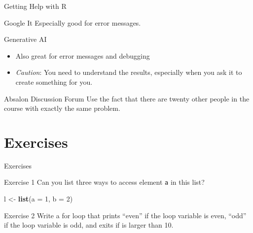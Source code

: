 \documentclass[
  ignorenonframetext,
  aspectratio=1610,
  onlytextwidth]{beamer}
\newenvironment{Shaded}{\begin{snugshade}}{\end{snugshade}}
\newcommand{\AttributeTok}[1]{\textcolor[rgb]{0.13,0.29,0.53}{#1}}
\newcommand{\DecValTok}[1]{\textcolor[rgb]{0.00,0.00,0.81}{#1}}
\newcommand{\FunctionTok}[1]{\textcolor[rgb]{0.13,0.29,0.53}{\textbf{#1}}}
\newcommand{\NormalTok}[1]{#1}
\newcommand{\OtherTok}[1]{\textcolor[rgb]{0.56,0.35,0.01}{#1}}
\providecommand{\tightlist}{}
\begin{document}
\begin{frame}{Getting Help with R}
\label{getting-help-with-r}
\begin{block}{Google It}
\label{google-it}
Especially good for error messages.

\pause
\end{block}

\begin{block}{Generative AI}
\label{generative-ai-1}
\begin{itemize}
\tightlist
\item
  Also great for error messages and debugging
\item
  \emph{Caution}: You need to understand the results, especially when
  you ask it to create something for you.
\end{itemize}

\pause
\end{block}

\begin{block}{Absalon Discussion Forum}
\label{absalon-discussion-forum}
Use the fact that there are twenty other people in the course with
exactly the same problem.
\end{block}
\end{frame}

\section{Exercises}\label{exercises}

\begin{frame}[fragile]{Exercises}
\begin{block}{Exercise 1}
\label{exercise-1}
Can you list three ways to access element \texttt{a} in this list?

\begin{Shaded}
\begin{Highlighting}[]
\NormalTok{l }\OtherTok{\textless{}{-}} \FunctionTok{list}\NormalTok{(}\AttributeTok{a =} \DecValTok{1}\NormalTok{, }\AttributeTok{b =} \DecValTok{2}\NormalTok{)}
\end{Highlighting}
\end{Shaded}

\pause
\end{block}

\begin{block}{Exercise 2}
\label{exercise-2}
Write a for loop that prints ``even'' if the loop variable is even,
``odd'' if the loop variable is odd, and exits if is larger than 10.
\end{block}
\end{frame}
\end{document}
